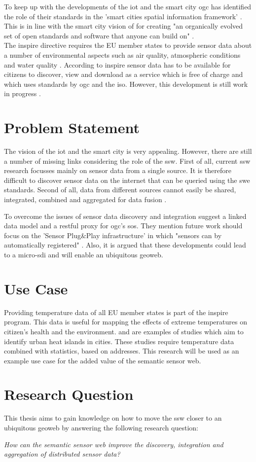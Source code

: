 To keep up with the developments of the \ac{iot} and the smart city \ac{ogc} has identified the role of their standards in the 'smart cities spatial information framework' \citep{SC:OGC}. This is in line with the smart city vision of \cite{SC:Townsend} for creating "an organically evolved set of open standards and software that anyone can build on" \citep[p. 290]{SC:Townsend}. \\

The \ac{inspire} directive requires the EU member states to provide sensor data about a number of environmental aspects such as air quality, atmospheric conditions and water quality \citep{SDI:INSPIRE2}. According to \ac{inspire} sensor data has to be available for citizens to discover, view and download as a service which is free of charge and which uses standards by \ac{ogc} and the \ac{iso}. However, this development is still work in progress \citep{SW:Kotsev}.   

\section{Problem Statement}
The vision of the \ac{iot} and the smart city is very appealing. However, there are still a number of missing links considering the role of the \ac{ssw}. First of all, current \ac{ssw} research focusses mainly on sensor data from a single source. It is therefore difficult to discover sensor data on the internet that can be queried using the \ac{swe} standards. Second of all, data from different sources cannot easily be shared, integrated, combined and aggregated for data fusion \citep{SSW:Wang, SSW:Ji, SSW:Corcho}. 

To overcome the issues of sensor data discovery and integration \cite{SSW:Janowicz} suggest a linked data model and a \ac{rest}ful proxy for \ac{ogc}’s \ac{sos}. They mention future work should focus on the 'Sensor Plug\&Play infrastructure' in which "sensors can by automatically registered" \cite[p. 21]{SSW:Janowicz}. Also, it is argued that these developments could lead to a \ac{micro-sdi} and will enable an ubiquitous geoweb.

\section{Use Case}
Providing temperature data of all EU member states is part of the \ac{inspire} program. This data is useful for mapping the effects of extreme temperatures on citizen's health and the environment. \cite{UC:vanderHoeven} and \cite{UC:vanderHoeven2} are examples of studies which aim to identify urban heat islands in cities. These studies require temperature data combined with statistics, based on addresses. This research will be used as an example use case for the added value of the semantic sensor web. 
 

\section{Research Question}
This thesis aims to gain knowledge on how to move the \ac{ssw} closer to an ubiquitous geoweb by answering the following research question: 

\textit{How can the semantic sensor web improve the discovery, integration and aggregation of distributed sensor data?}

